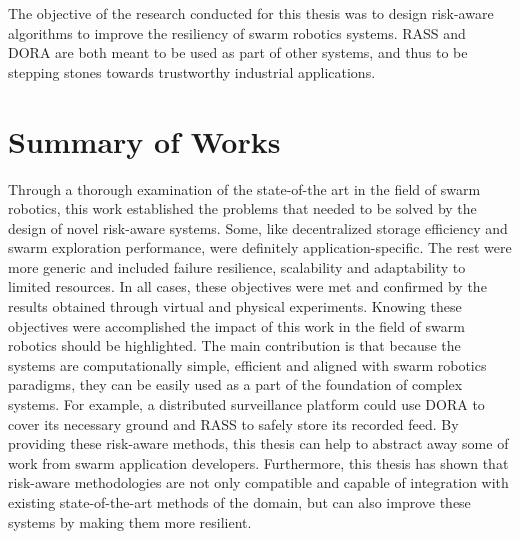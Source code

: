 \label{sec:Conclusion}
The objective of the research conducted for this thesis was to design risk-aware algorithms to improve the resiliency of swarm robotics systems. RASS and DORA are both meant to be used as part of other systems, and thus to be stepping stones towards trustworthy industrial applications.

\section{Summary of Works}
Through a thorough examination of the state-of-the art in the field of swarm robotics, this work established the problems that needed to be solved by the design of novel risk-aware systems. Some, like decentralized storage efficiency and swarm exploration performance, were definitely application-specific. The rest were more generic and included failure resilience, scalability and adaptability to limited resources. In all cases, these objectives were met and confirmed by the results obtained through virtual and physical experiments. Knowing these objectives were accomplished the impact of this work in the field of swarm robotics should be highlighted. The main contribution is that because the systems are computationally simple, efficient and aligned with swarm robotics paradigms, they can be easily used as a part of the foundation of complex systems. For example, a distributed surveillance platform could use \ac{DORA} to cover its necessary ground and \ac{RASS} to safely store its recorded feed. By providing these risk-aware methods, this thesis can help to abstract away some of work from swarm application developers. Furthermore, this thesis has shown that risk-aware methodologies are not only compatible and capable of integration with existing state-of-the-art methods of the domain, but can also improve these systems by making them more resilient.


